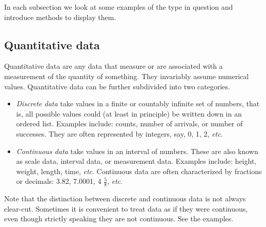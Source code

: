 \documentclass[captions=tableheading]{scrbook}
\begin{document}
In each subsection we look at some examples of the type in question and introduce methods to display them.
\subsection{Quantitative data}
\label{sec-2-1-1}

\label{sub:Quantitative-Data}

Quantitative data are any data that measure or are associated with a measurement of the quantity of something. They invariably assume numerical values. Quantitative data can be further subdivided into two categories. 

\begin{itemize}
\item \emph{Discrete data} take values in a finite or countably infinite set of numbers, that is, all possible values could (at least in principle) be written down in an ordered list. Examples include: counts, number of arrivals, or number of successes. They are often represented by integers, say, 0, 1, 2, \emph{etc}.
\item \emph{Continuous data} take values in an interval of numbers. These are also known as scale data, interval data, or measurement data. Examples include: height, weight, length, time, \emph{etc}. Continuous data are often characterized by fractions or decimals: 3.82, 7.0001, 4 \(\frac{5}{8}\), \emph{etc}.
\end{itemize}

Note that the distinction between discrete and continuous data is not always clear-cut. Sometimes it is convenient to treat data as if they were continuous, even though strictly speaking they are not continuous. See the examples.
\end{document}
